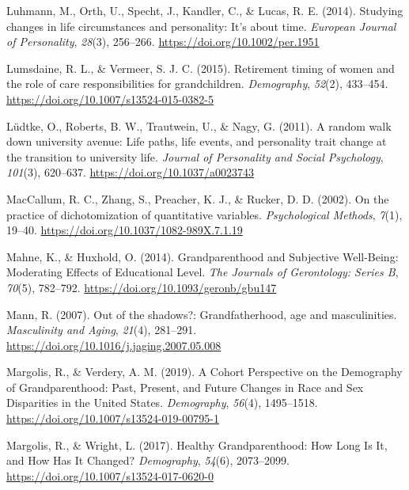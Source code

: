 \documentclass[
  english,
  man, noextraspace]{apa7}
\begin{document}
\leavevmode\hypertarget{ref-luhmannStudyingChangesLife2014}{}%
Luhmann, M., Orth, U., Specht, J., Kandler, C., \& Lucas, R. E. (2014). Studying changes in life circumstances and personality: It's about time. \emph{European Journal of Personality}, \emph{28}(3), 256--266. \url{https://doi.org/10.1002/per.1951}

\leavevmode\hypertarget{ref-lumsdaineRetirementTimingWomen2015}{}%
Lumsdaine, R. L., \& Vermeer, S. J. C. (2015). Retirement timing of women and the role of care responsibilities for grandchildren. \emph{Demography}, \emph{52}(2), 433--454. \url{https://doi.org/10.1007/s13524-015-0382-5}

\leavevmode\hypertarget{ref-ludtkeRandomWalkUniversity2011}{}%
Lüdtke, O., Roberts, B. W., Trautwein, U., \& Nagy, G. (2011). A random walk down university avenue: Life paths, life events, and personality trait change at the transition to university life. \emph{Journal of Personality and Social Psychology}, \emph{101}(3), 620--637. \url{https://doi.org/10.1037/a0023743}

\leavevmode\hypertarget{ref-maccallumPracticeDichotomizationQuantitative2002}{}%
MacCallum, R. C., Zhang, S., Preacher, K. J., \& Rucker, D. D. (2002). On the practice of dichotomization of quantitative variables. \emph{Psychological Methods}, \emph{7}(1), 19--40. \url{https://doi.org/10.1037/1082-989X.7.1.19}

\leavevmode\hypertarget{ref-mahneGrandparenthoodSubjectiveWellBeing2014}{}%
Mahne, K., \& Huxhold, O. (2014). Grandparenthood and Subjective Well-Being: Moderating Effects of Educational Level. \emph{The Journals of Gerontology: Series B}, \emph{70}(5), 782--792. \url{https://doi.org/10.1093/geronb/gbu147}

\leavevmode\hypertarget{ref-mannOutShadowsGrandfatherhood2007}{}%
Mann, R. (2007). Out of the shadows?: Grandfatherhood, age and masculinities. \emph{Masculinity and Aging}, \emph{21}(4), 281--291. \url{https://doi.org/10.1016/j.jaging.2007.05.008}

\leavevmode\hypertarget{ref-margolisCohortPerspectiveDemography2019}{}%
Margolis, R., \& Verdery, A. M. (2019). A Cohort Perspective on the Demography of Grandparenthood: Past, Present, and Future Changes in Race and Sex Disparities in the United States. \emph{Demography}, \emph{56}(4), 1495--1518. \url{https://doi.org/10.1007/s13524-019-00795-1}

\leavevmode\hypertarget{ref-margolisHealthyGrandparenthoodHow2017}{}%
Margolis, R., \& Wright, L. (2017). Healthy Grandparenthood: How Long Is It, and How Has It Changed? \emph{Demography}, \emph{54}(6), 2073--2099. \url{https://doi.org/10.1007/s13524-017-0620-0}
\end{document}
